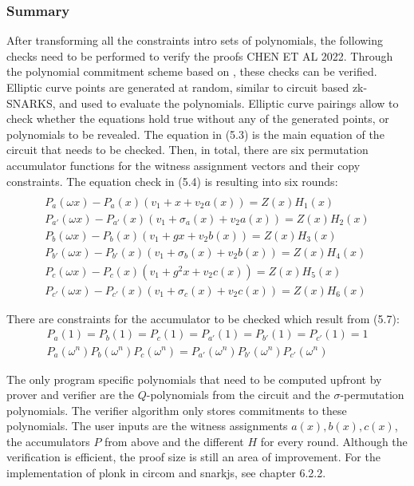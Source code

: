 \subsubsection{Summary}
After transforming all the constraints intro sets of polynomials, the following checks need to be performed to verify the proofs \citep{PLONKcryptoeprint:2019/953, buterinplonk} CHEN ET AL 2022. Through the polynomial commitment scheme based on \citep{Kate2010ConstantSizeCT}, these checks can be verified. Elliptic curve points are generated at random, similar to circuit based zk-SNARKS, and used to evaluate the polynomials. Elliptic curve pairings allow to check whether the equations hold true without any of the generated points, or polynomials to be revealed. 
The equation in (5.3) is the main equation of the circuit that needs to be checked. Then, in total, there are six permutation accumulator functions for the witness assignment vectors and their copy constraints. The equation check in (5.4) is resulting into six rounds:
\begin{align}
\end{align}
\begin{align*}
    P_{a}(\omega x) - P_{a}(x)(v_1 + x + v_2a(x)) = Z(x)H_{1}(x) \\
    P_{a'}(\omega x) - P_{a'}(x)(v_1 + \sigma_{a}(x) + v_2a(x)) = Z(x)H_{2}(x) \\
    P_{b}(\omega x) - P_{b}(x)(v_1 + gx + v_2b(x)) = Z(x)H_{3}(x) \\
    P_{b'}(\omega x) - P_{b'}(x)(v_1 + \sigma_{b}(x) + v_2b(x)) = Z(x)H_{4}(x) \\
    P_{c}(\omega x) - P_{c}(x)(v_1 + g^{2}x + v_2c(x)) = Z(x)H_{5}(x) \\
    P_{c'}(\omega x) - P_{c'}(x)(v_1 + \sigma_{c}(x) + v_2c(x)) = Z(x)H_{6}(x)
\end{align*}

There are constraints for the accumulator to be checked which result from (5.7):
\begin{align}
    P_{a}(1) = P_{b}(1) = P_{c}(1) = P_{a'}(1) = P_{b'}(1) = P_{c'}(1) = 1 \\
    P_{a}(\omega^n)P_{b}(\omega^n)P_{c}(\omega^n) = P_{a'}(\omega^n)P_{b'}(\omega^n)P_{c'}(\omega^n)
\end{align}

The only program specific polynomials that need to be computed upfront by prover and verifier are the \(Q\)-polynomials from the circuit and the \(\sigma\)-permutation polynomials. The verifier algorithm only stores commitments to these polynomials. The user inputs are the witness assignments \(a(x), b(x), c(x)\), the accumulators \(P\) from above and the different \(H\) for every round. Although the verification is efficient, the proof size is still an area of improvement. For the implementation of plonk in circom and snarkjs, see chapter 6.2.2.

